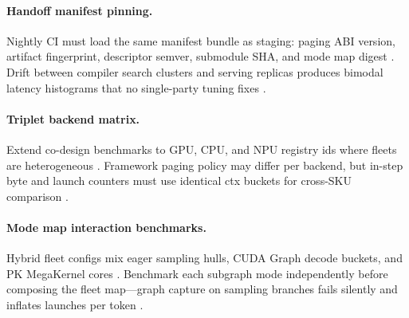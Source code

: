\paragraph{Handoff manifest pinning.} Nightly CI must load the same manifest bundle as staging: paging ABI version, artifact fingerprint, descriptor semver, submodule SHA, and mode map digest \citep{yirage2026,chen2020compilerbasedhardw,patel2025llminference,kwon2023vllm,taxbreak2026,memoryfloor2026,liu2024deepseekv3,nvidia2024cudagraphs,dao2022flashattention,amd2024xdna,amd2024aie,dao2023flashdecoding,nvidia2022hopper,semianalysis2024tma,dlbook}. Drift between compiler search clusters and serving replicas produces bimodal latency histograms that no single-party tuning fixes \citep{patel2025llminference,yirage2026,chen2020compilerbasedhardw,kwon2023vllm,memoryfloor2026,taxbreak2026,liu2024deepseekv3,nvidia2024cudagraphs,dao2022flashattention,amd2024aie,amd2024xdna,dlbook,dao2023flashdecoding,nvidia2022hopper,semianalysis2024tma}.

\paragraph{Triplet backend matrix.} Extend co-design benchmarks to GPU, CPU, and NPU registry ids where fleets are heterogeneous \citep{yirage2026,chen2020compilerbasedhardw,patel2025llminference,amd2024xdna,amd2024aie,taxbreak2026,memoryfloor2026,kwon2023vllm,liu2024deepseekv3,nvidia2024cudagraphs,dao2022flashattention,dao2023flashdecoding,nvidia2022hopper,semianalysis2024tma,dlbook}. Framework paging policy may differ per backend, but in-step byte and launch counters must use identical ctx buckets for cross-SKU comparison \citep{patel2025llminference,yirage2026,chen2020compilerbasedhardw,kwon2023vllm,memoryfloor2026,taxbreak2026,liu2024deepseekv3,nvidia2024cudagraphs,dao2022flashattention,amd2024aie,amd2024xdna,dlbook,dao2023flashdecoding,nvidia2022hopper,semianalysis2024tma}.

\paragraph{Mode map interaction benchmarks.} Hybrid fleet configs mix eager sampling hulls, CUDA Graph decode buckets, and PK MegaKernel cores \citep{nvidia2024cudagraphs,yirage2026,chen2020compilerbasedhardw,patel2025llminference,kwon2023vllm,taxbreak2026,memoryfloor2026,liu2024deepseekv3,dao2022flashattention,amd2024xdna,amd2024aie,dlbook,dao2023flashdecoding,nvidia2022hopper,semianalysis2024tma}. Benchmark each subgraph mode independently before composing the fleet map---graph capture on sampling branches fails silently and inflates launches per token \citep{nvidia2024cudagraphs,kwon2023vllm,patel2025llminference,yirage2026,chen2020compilerbasedhardw,taxbreak2026,memoryfloor2026,dlbook}.

